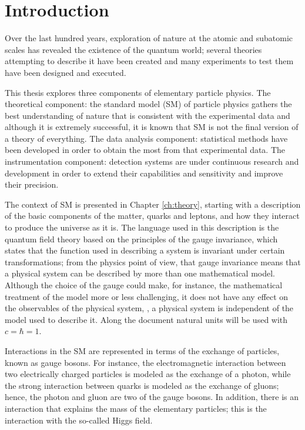 \chapter{Introduction}
\label{ch:intro}

Over the last hundred years, exploration of nature at the atomic and subatomic scales has revealed the existence of the quantum world; several theories attempting to describe it have been created and many experiments to test them have been designed and executed.

This thesis explores three components of elementary particle physics. The theoretical component: the standard model (SM) of particle physics gathers the best understanding of nature that is consistent with the experimental data and although it is extremely successful, it is known that SM is not the final version of a theory of everything. The data analysis component: statistical methods have been developed in order to obtain the most from that experimental data. The instrumentation component: detection systems are under continuous research and development in order to extend their capabilities and sensitivity and improve their precision. 

The context of SM is presented in Chapter \ref{ch:theory}, starting with a description of the basic components of the matter, quarks and leptons, and how they interact to produce the universe as it is. The language used in this description is the quantum field theory based on the principles of the gauge invariance, which states that the function used in describing a system is invariant under certain transformations; from the physics point of view, that gauge invariance means that a physical system can be described by more than one mathematical model. Although the choice of the gauge could make, for instance, the mathematical treatment of the model more or less challenging, it does not have any effect on the observables of the physical system, \ie, a physical system is independent of the model used to describe it. Along the document natural units will be used with $c=\hbar=1$. 

Interactions in the SM are represented in terms of the exchange of particles, known as gauge bosons. For instance, the electromagnetic interaction between two electrically charged particles is modeled as the exchange of a photon, while the strong interaction between quarks is modeled as the exchange of gluons; hence, the photon and gluon are two of the gauge bosons. In addition, there is an interaction that explains the mass of the elementary particles; this is the interaction with the so-called Higgs field.    

